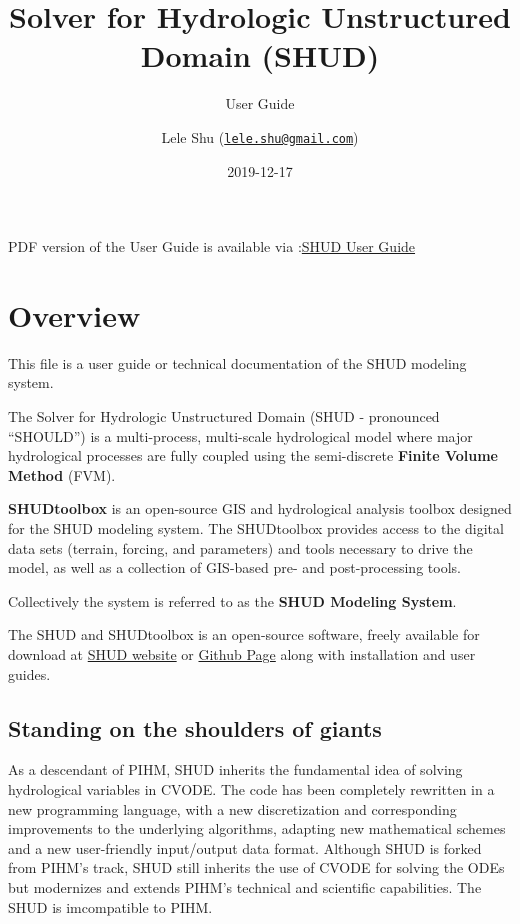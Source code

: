 \documentclass[
]{scrbook}
\title{Solver for Hydrologic Unstructured Domain (SHUD)}
\subtitle{User Guide}
\author{Lele Shu (\href{mailto:lele.shu@gmail.com}{\nolinkurl{lele.shu@gmail.com}})}
\date{2019-12-17}
\begin{document}
\frontmatter
\maketitle

{
\setcounter{tocdepth}{1}
\tableofcontents
}
\mainmatter
PDF version of the User Guide is available via :\href{https://www.shud.xyz/_book/SHUD_User_Guide.pdf}{SHUD User Guide}

\hypertarget{Overview}{%
\chapter{Overview}\label{Overview}}

This file is a user guide or technical documentation of the SHUD modeling system.

The Solver for Hydrologic Unstructured Domain (SHUD - pronounced ``SHOULD'') is a multi-process, multi-scale hydrological model where major hydrological processes are fully coupled using the semi-discrete \textbf{Finite Volume Method} (FVM).

\textbf{SHUDtoolbox} is an open-source GIS and hydrological analysis toolbox designed for the SHUD modeling system. The SHUDtoolbox provides access to the digital data sets (terrain, forcing, and parameters) and tools necessary to drive the model, as well as a collection of GIS-based pre- and post-processing tools.

Collectively the system is referred to as the \textbf{SHUD Modeling System}.

The SHUD and SHUDtoolbox is an open-source software, freely available for download at \href{https://SHUD-system.github.io}{SHUD website} or \href{https://github.com/SHUD-System/}{Github Page} along with installation and user guides.

\hypertarget{standing-on-the-shoulders-of-giants}{%
\section{Standing on the shoulders of giants}\label{standing-on-the-shoulders-of-giants}}

As a descendant of PIHM, SHUD inherits the fundamental idea of solving hydrological variables in CVODE. The code has been completely rewritten in a new programming language, with a new discretization and corresponding improvements to the underlying algorithms, adapting new mathematical schemes and a new user-friendly input/output data format. Although SHUD is forked from PIHM's track, SHUD still inherits the use of CVODE for solving the ODEs but modernizes and extends PIHM's technical and scientific capabilities. The SHUD is imcompatible to PIHM.
\end{document}
